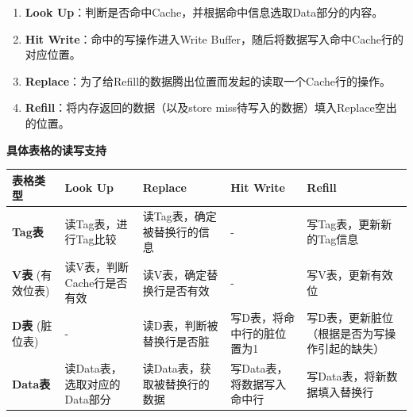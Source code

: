\begin{enumerate}
\def\labelenumi{\arabic{enumi}.}
\tightlist
\item
  \textbf{Look Up}：判断是否命中Cache，并根据命中信息选取Data部分的内容。
\item
  \textbf{Hit Write}：命中的写操作进入Write Buffer，随后将数据写入命中Cache行的对应位置。
\item
  \textbf{Replace}：为了给Refill的数据腾出位置而发起的读取一个Cache行的操作。
\item
  \textbf{Refill}：将内存返回的数据（以及store miss待写入的数据）填入Replace空出的位置。
\end{enumerate}

\textbf{具体表格的读写支持}

\begin{longtable}[]{@{}
  >{\raggedright\arraybackslash}p{}
  >{\raggedright\arraybackslash}p{}
  >{\raggedright\arraybackslash}p{}
  >{\raggedright\arraybackslash}p{}
  >{\raggedright\arraybackslash}p{}@{}}
\toprule\noalign{}
\begin{minipage}[b]{\linewidth}\raggedright
表格类型
\end{minipage} & \begin{minipage}[b]{\linewidth}\raggedright
Look Up
\end{minipage} & \begin{minipage}[b]{\linewidth}\raggedright
Replace
\end{minipage} & \begin{minipage}[b]{\linewidth}\raggedright
Hit Write
\end{minipage} & \begin{minipage}[b]{\linewidth}\raggedright
Refill
\end{minipage} \\
\midrule\noalign{}
\endhead
\bottomrule\noalign{}
\endlastfoot
\textbf{Tag表} & 读Tag表，进行Tag比较 & 读Tag表，确定被替换行的信息 & - & 写Tag表，更新新的Tag信息 \\
\textbf{V表} (有效位表) & 读V表，判断Cache行是否有效 & 读V表，确定替换行是否有效 & - & 写V表，更新有效位 \\
\textbf{D表} (脏位表) & - & 读D表，判断被替换行是否脏 & 写D表，将命中行的脏位置为1 & 写D表，更新脏位（根据是否为写操作引起的缺失） \\
\textbf{Data表} & 读Data表，选取对应的Data部分 & 读Data表，获取被替换行的数据 & 写Data表，将数据写入命中行 & 写Data表，将新数据填入替换行 \\
\end{longtable}


